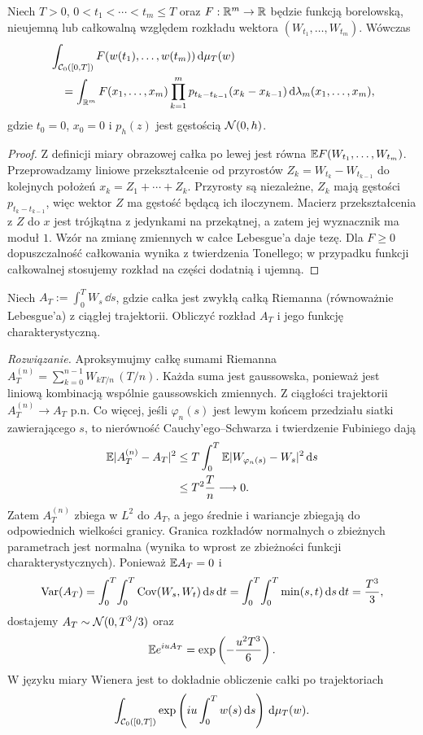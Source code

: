 \begin{twierdzenie}
Niech $T>0$, $0<t_1<\cdots<t_m\le T$ oraz
$F:\mathbb{R}^m\to\mathbb{R}$ będzie funkcją borelowską, nieujemną
lub całkowalną względem rozkładu wektora
$(W_{t_1},\ldots,W_{t_m})$. Wówczas
\begin{align*}
&\int_{\mathcal{C}_0([0,T])}F(w(t_1),\ldots,w(t_m))\,\mathrm{d}\mu_T(w)\\
&\quad=\int_{\mathbb{R}^m}F(x_1,\ldots,x_m)
\prod_{k=1}^m p_{t_k-t_{k-1}}(x_k-x_{k-1})
\,\mathrm{d}\lambda_m(x_1,\ldots,x_m),
\end{align*}
gdzie $t_0=0$, $x_0=0$ i $p_h(z)$ jest gęstością
$\mathcal{N}(0,h)$.
\end{twierdzenie}
\begin{proof}
Z definicji miary obrazowej całka po lewej jest równa
$\mathbb{E} F(W_{t_1},\ldots,W_{t_m})$.
Przeprowadzamy liniowe przekształcenie od przyrostów
$Z_k=W_{t_k}-W_{t_{k-1}}$ do kolejnych położeń
$x_k=Z_1+\cdots+Z_k$.
Przyrosty są niezależne, $Z_k$ mają gęstości
$p_{t_k-t_{k-1}}$, więc wektor $Z$ ma gęstość
będącą ich iloczynem. Macierz przekształcenia z $Z$
do $x$ jest trójkątna z jedynkami na przekątnej,
a zatem jej wyznacznik ma moduł $1$.
Wzór na zmianę zmiennych w całce Lebesgue'a
daje tezę. Dla $F\ge0$ dopuszczalność całkowania
wynika z twierdzenia Tonellego; w przypadku funkcji
całkowalnej stosujemy rozkład na części dodatnią i ujemną.
\end{proof}

\begin{zadanie}
Niech $A_T:=\int_0^T W_s\,\dd s$, gdzie całka jest zwykłą
całką Riemanna (równoważnie Lebesgue'a) z ciągłej trajektorii.
Obliczyć rozkład $A_T$ i jego funkcję charakterystyczną.

\emph{Rozwiązanie.} Aproksymujmy całkę sumami Riemanna
$A_T^{(n)}=\sum_{k=0}^{n-1}W_{kT/n}\,(T/n)$.
Każda suma jest gaussowska, ponieważ jest liniową
kombinacją wspólnie gaussowskich zmiennych.
Z ciągłości trajektorii $A_T^{(n)}\to A_T$ p.n.
Co więcej, jeśli $\varphi_n(s)$ jest lewym końcem
przedziału siatki zawierającego $s$, to nierówność
Cauchy'ego--Schwarza i twierdzenie Fubiniego dają
\begin{align*}
\mathbb{E}|A_T^{(n)}-A_T|^2
&\le T\int_0^T\mathbb{E}|W_{\varphi_n(s)}-W_s|^2\,\mathrm{d} s\\
&\le T^2\frac{T}{n}\longrightarrow0.
\end{align*}
Zatem $A_T^{(n)}$ zbiega w $L^2$ do $A_T$,
a jego średnie i wariancje zbiegają do odpowiednich
wielkości granicy. Granica rozkładów normalnych o
zbieżnych parametrach jest normalna (wynika to wprost
ze zbieżności funkcji charakterystycznych).
Ponieważ $\mathbb{E} A_T=0$ i
\[
\operatorname{Var}(A_T)=\int_0^T\!\int_0^T\operatorname{Cov}(W_s,W_t)
\,\mathrm{d} s\,\mathrm{d} t
=\int_0^T\!\int_0^T\min(s,t)\,\mathrm{d} s\,\mathrm{d} t
=\frac{T^3}{3},
\]
dostajemy $A_T\sim\mathcal{N}(0,T^3/3)$ oraz
\[
\mathbb{E} e^{iuA_T}=\exp\left(-\frac{u^2T^3}{6}\right).
\]
W języku miary Wienera jest to dokładnie obliczenie
całki po trajektoriach
\[
\int_{\mathcal{C}_0([0,T])}
\exp\left(iu\int_0^T w(s)\,\mathrm{d} s\right)\,\mathrm{d}\mu_T(w).
\]
\end{zadanie}

